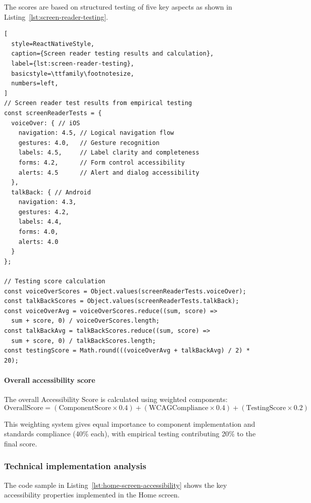 The scores are based on structured testing of five key aspects as shown in Listing~\ref{lst:screen-reader-testing}.

\begin{lstlisting}[
  style=ReactNativeStyle,
  caption={Screen reader testing results and calculation},
  label={lst:screen-reader-testing},
  basicstyle=\ttfamily\footnotesize,
  numbers=left,
]
// Screen reader test results from empirical testing
const screenReaderTests = {
  voiceOver: { // iOS
    navigation: 4.5, // Logical navigation flow
    gestures: 4.0,   // Gesture recognition
    labels: 4.5,     // Label clarity and completeness
    forms: 4.2,      // Form control accessibility
    alerts: 4.5      // Alert and dialog accessibility
  },
  talkBack: { // Android
    navigation: 4.3,
    gestures: 4.2,
    labels: 4.4,
    forms: 4.0,
    alerts: 4.0
  }
};

// Testing score calculation
const voiceOverScores = Object.values(screenReaderTests.voiceOver);
const talkBackScores = Object.values(screenReaderTests.talkBack);
const voiceOverAvg = voiceOverScores.reduce((sum, score) => 
  sum + score, 0) / voiceOverScores.length;
const talkBackAvg = talkBackScores.reduce((sum, score) => 
  sum + score, 0) / talkBackScores.length;
const testingScore = Math.round(((voiceOverAvg + talkBackAvg) / 2) * 20);
\end{lstlisting}

\paragraph{Overall accessibility score}

The overall Accessibility Score is calculated using weighted components:
\begin{equation}
\text{OverallScore} 
= (\text{ComponentScore} \times 0.4) 
+ (\text{WCAGCompliance} \times 0.4) 
+ (\text{TestingScore} \times 0.2)
\end{equation}

This weighting system gives equal importance to component implementation and standards compliance (40\% each), with empirical testing contributing 20\% to the final score.

\subsubsection{Technical implementation analysis}

The code sample in Listing~\ref{lst:home-screen-accessibility} shows the key accessibility properties implemented in the Home screen.

